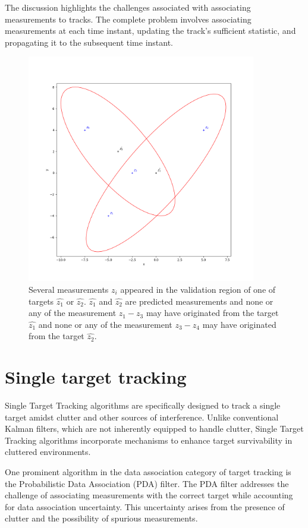 The discussion highlights the challenges associated with associating measurements to tracks. The complete problem involves associating measurements at each time instant, updating the track's sufficient statistic, and propagating it to the subsequent time instant.

\begin{figure}[h]
    \centering
    \includegraphics[width=10cm]{text/chapter_02/imgs/clutter_multiTarget}
    \caption{Several measurements $z_i$ appeared in the validation region of one of targets $\hat{z_1}$ or $\hat{z_2}$. $\hat{z_1}$ and $\hat{z_2}$ are predicted
    measurements and none or any of the measurement $z_1 - z_3$ may have originated from the target $\hat{z_1}$ and none or any of the measurement $z_3 - z_4$ may have originated from the target $\hat{z_2}$.}
    \label{fig:twoTargetsInClutter}
\end{figure}


\section{Single target tracking}
Single Target Tracking algorithms are specifically designed to track a single target amidst clutter and other sources of interference. Unlike conventional Kalman filters, which are not inherently equipped to handle clutter, Single Target Tracking algorithms incorporate mechanisms to enhance target survivability in cluttered environments.

One prominent algorithm in the data association category of target tracking is the Probabilistic Data Association (PDA) filter. The PDA filter addresses the challenge of associating measurements with the correct target while accounting for data association uncertainty. This uncertainty arises from the presence of clutter and the possibility of spurious measurements.


